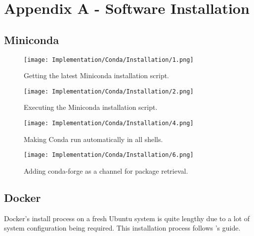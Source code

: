 \chapter*{Appendix A - Software Installation}
\section*{Miniconda}

\begin{figure}[H]
    \centering
    \texttt{[image: Implementation/Conda/Installation/1.png]}
    \caption{Getting the latest Miniconda installation script.}
    \label{fig:CondaInstall1}
\end{figure}

\begin{figure}[H]
    \centering
    \texttt{[image: Implementation/Conda/Installation/2.png]}
    \caption{Executing the Miniconda installation script.}
    \label{fig:CondaInstall2}
\end{figure}


\begin{figure}[H]
    \centering
    \texttt{[image: Implementation/Conda/Installation/4.png]}
    \caption{Making Conda run automatically in all shells.}
    \label{fig:CondaInstall4}
\end{figure}

\begin{figure}[H]
    \centering
    \texttt{[image: Implementation/Conda/Installation/6.png]}
    \caption{Adding conda-forge as a channel for package retrieval.}
    \label{fig:CondaInstall6}
\end{figure}

\pagebreak 
\section*{Docker}
Docker's install process on a fresh Ubuntu system is quite lengthy due to a lot of 
system configuration being required. This installation process follows 
\textcite{digitalocean_how_nodate}'s guide.

